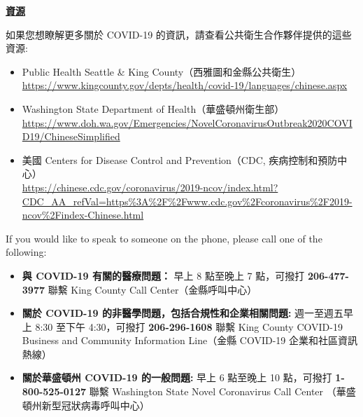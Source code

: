 \documentclass[10pt]{article}
\begin{document}
\bigskip

\large \underline{\textbf{資源}}

如果您想瞭解更多關於 COVID-19 的資訊，請查看公共衛生合作夥伴提供的這些資源:

\begin{itemize}
\item
  Public Health \textemdash Seattle \& King County（西雅圖和金縣公共衛生）\\
  \url{https://www.kingcounty.gov/depts/health/covid-19/languages/chinese.aspx}

\item

  Washington State Department of Health（華盛頓州衛生部）\\
  \url{https://www.doh.wa.gov/Emergencies/NovelCoronavirusOutbreak2020COVID19/ChineseSimplified}

\item
  美國 Centers for Disease Control and Prevention（CDC, 疾病控制和預防中心）\\
  \url{https://chinese.cdc.gov/coronavirus/2019-ncov/index.html?CDC\_AA\_refVal=https%3A%2F%2Fwww.cdc.gov%2Fcoronavirus%2F2019-ncov%2Findex-Chinese.html}

\end{itemize}

If you would like to speak to someone on the phone, please call one of the
following:

\begin{itemize}

\item

  \textbf{與 COVID-19 有關的醫療問題：} 早上 8 點至晚上 7 點，可撥打
  \textbf{206-477-3977} 聯繫 King County Call Center（金縣呼叫中心）

\item

  \textbf{關於 COVID-19 的非醫學問題，包括合規性和企業相關問題:} 週一至週五早上 8:30
  至下午 4:30，可撥打 \textbf{206-296-1608} 聯繫 King County COVID-19 Business and Community
  Information Line（金縣 COVID-19 企業和社區資訊熱線）

\item

  \textbf{關於華盛頓州 COVID-19 的一般問題:} 早上 6 點至晚上 10 點，可撥打
  \textbf{1-800-525-0127} 聯繫 Washington State Novel Coronavirus Call Center
  （華盛頓州新型冠狀病毒呼叫中心）

\end{itemize}
\end{document}
